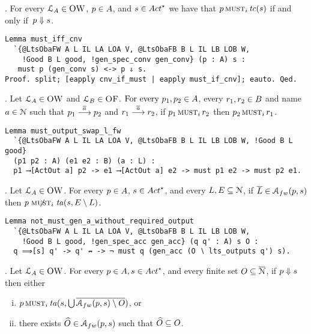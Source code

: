 .
For every $\mathcal{L}_{A} \in \textsc{OW}$,
$p \in A$, and
$\trace \in \Actfin$ we have that $p \operatorname{\textsc{must}}_i  \mathit{tc}( s) $
if and only if~$p \mathrel{\Downarrow} s$.

\begin{mdframed}
\begin{verbatim}
Lemma must_iff_cnv
  `{@LtsObaFW A L IL LA LOA V, @LtsObaFB B L IL LB LOB W,
    !Good B L good, !gen_spec_conv gen_conv} (p : A) s :
   must p (gen_conv s) <-> p ⇓ s.
Proof. split; [eapply cnv_if_must | eapply must_if_cnv]; eauto. Qed.
\end{verbatim}
\end{mdframed}

.
  Let $\mathcal{L}_A \in \textsc{OW}$ and
  $\mathcal{L}_B \in \textsc{OF}$.
  $\text{For every } p_1, p_2 \in A$,
  every $r_1, r_2 \in B$ and name $a \in \mathcal{N}$ such that
  $p_1 \mathrel{\overset{\overline{a}}\longrightarrow} p_2$ and
  $r_1 \mathrel{\overset{\overline{a}}\longrightarrow} r_2$,
  if $p_1 \operatorname{\textsc{must}}_i r_2$ then $p_2 \operatorname{\textsc{must}}_i r_1$.

\begin{mdframed}
\begin{verbatim}
Lemma must_output_swap_l_fw
  `{@LtsObaFW A L IL LA LOA V, @LtsObaFB B L IL LB LOB W, !Good B L good}
  (p1 p2 : A) (e1 e2 : B) (a : L) :
  p1 ⟶[ActOut a] p2 -> e1 ⟶[ActOut a] e2 -> must p1 e2 -> must p2 e1.
\end{verbatim}
\end{mdframed}

.
Let $\mathcal{L}_A \in \textsc{OW}$.
For every $p \in A$, $\trace \in \Actfin$,
and every $L, E \subseteq \mathcal{N}$, if
$\co{L} \in \accht{ \server }{ \trace }$
then $\Nmusti{ \server }{ \testacc{\trace}{E \setminus L}}$.

\begin{mdframed}
\begin{verbatim}
Lemma not_must_gen_a_without_required_output
  `{@LtsObaFW A L IL LA LOA V, @LtsObaFB B L IL LB LOB W,
    !Good B L good, !gen_spec_acc gen_acc} (q q' : A) s O :
  q ⟹[s] q' -> q' ↛ -> ¬ must q (gen_acc (O ∖ lts_outputs q') s).
\end{verbatim}
\end{mdframed}

.
Let $\mathcal{L}_A \in \textsc{OW}$.
$\Forevery \server \in \States, \trace \in \Actfin$,
and every finite set $O \subseteq \overline{\mathcal{N}}$,
if $p \mathrel{\Downarrow} s$ then either
\begin{enumerate}[(i)]
\item
  $\musti{\server}{\testacc{ \trace }{ \bigcup \co{ \accht{p}{s}
      \setminus \ohmy }}}$, or
\item
  there exists $\widehat{\ohmy} \in \accht{ \server }{ \trace }$ such that $\widehat{O} \subseteq O$.
\end{enumerate}

